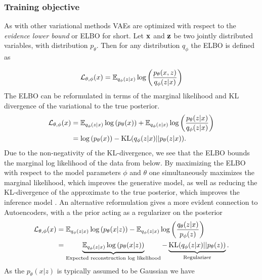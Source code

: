 \documentclass[../../thesis.tex]{subfiles}
\begin{document}
\subsubsection{Training objective}

As with other variational methods VAEs are optimized with respect to the \textit{evidence lower bound} or ELBO for short. Let $\mathbf{x}$ and $\mathbf{z}$ be two jointly distributed variables, with distribution $p_\theta$. Then for any distribution $q_\phi$ the ELBO is defined as

\begin{equation}
    \label{eq:ELBO}
    \mathcal{L}_{\theta,\phi}(x) 
    = \mathbb{E}_{q_\phi(z|x)} \log \left( \frac{p_\theta(x,z)}{q_\phi(z|x)}\right)
\end{equation}
The ELBO can be reformulated in terms of the marginal likelihood and KL divergence of the variational to the true posterior.
\begin{equation}
    \begin{aligned}
        \label{eq:ELBO_loglik}
        \mathcal{L}_{\theta,\phi}(x) 
        &=  \mathbb{E}_{q_\phi(z|x)} \log \left( p_\theta(x)\right) + \mathbb{E}_{q_\phi(z|x)} \log \left( \frac{p_\theta(z|x)}{q_\phi(z|x)}\right) \\
        &= \log \left( p_\theta(x)\right) - \textrm{KL}(q_\phi(z|x)|| p_\theta(z|x)).
    \end{aligned}
\end{equation}
Due to the non-negativity of the KL-divergence, we see that the ELBO bounds the marginal log likelihood of the data from below. By maximizing the ELBO with respect to the model parameters $\phi$ and $\theta$ one simultaneously maximizes the marginal likelihood, which improves the generative model, as well as reducing the KL-divergence of the approximate to the true posterior, which improves the inference model \cite{VAE}.\newline
An alternative reformulation gives a more evident connection to Autoencoders, with a the prior acting as a regularizer on the posterior 
\begin{equation}
    \begin{aligned}
        \label{eq:ELBO_AE}
        \mathcal{L}_{\theta,\phi}(x) 
        &=  \mathbb{E}_{q_\phi(z|x)} \log \left( p_\theta(x|z)\right) - \mathbb{E}_{q_\phi(z|x)} \log \left( \frac{q_\theta(z|x)}{p_\phi(z)}\right) \\
        &= \underbrace{\mathbb{E}_{q_\phi(z|x)} \log \left( p_\theta(x|z)\right)}_{\text{Expected reconstruction log likelihood}} - \underbrace{\textrm{KL}(q_\phi(z|x)|| p_\theta(z))}_{\text{Regularizer}}.
    \end{aligned}
\end{equation}
As the $p_\theta(x|z)$ is typically assumed to be Gaussian we have
\end{document}
